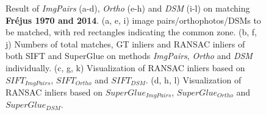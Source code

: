 \begin{figure}[htbp]
\begin{center}
{\begin{minipage}[t]{0.48\linewidth}
            \end{minipage}%
        }
        \caption{{\scriptsize Result of \textit{ImgPairs} (a-d), \textit{Ortho} (e-h) and \textit{DSM} (i-l) on matching \textbf{Fr{\'e}jus 1970 and 2014}. (a, e, i) image pairs/orthophotos/DSMs to be matched, with red rectangles indicating the common zone. (b, f, j) Numbers of total matches, GT inliers and RANSAC inliers of both SIFT and SuperGlue on methods \textit{ImgPairs}, \textit{Ortho} and \textit{DSM} individually. (c, g, k) Visualization of RANSAC inliers based on $SIFT_{ImgPairs}$, $SIFT_{Ortho}$ and $SIFT_{DSM}$. (d, h, l) Visualization of RANSAC inliers based on $SuperGlue_{ImgPairs}$, $SuperGlue_{Ortho}$ and $SuperGlue_{DSM}$.}}
        \label{MatchVizFrejus1970DSM}
    \end{center}
\end{figure} 


